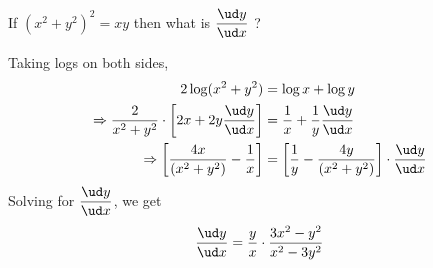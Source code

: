     \question[7] If $(x^2+y^2)^2=xy$ then what is $\dfrac{\ud y}{\ud x}$ ?
    \ifprintanswers
    \fi 
    \begin{solution}[\fullpage]
    Taking logs on both sides,
      \begin{align}
        2\log(x^2+y^2) &= \log x + \log y \\ 
        \Rightarrow \dfrac{2}{x^2+y^2}\cdot\left[ 2x+2y\dfrac{\ud y}{\ud x}\right] &=
        \dfrac{1}{x} + \dfrac{1}{y}\dfrac{\ud y}{\ud x} \\ 
        \Rightarrow\left[\frac{4x}{(x^2+y^2)}-\frac{1}{x}\right] &=
        \left[\frac{1}{y} - \frac{4y}{(x^2+y^2)}\right]\cdot\frac{\ud y}{\ud x} 
      \end{align}  
      Solving for $\dfrac{\ud y}{\ud x}$, we get \\
      \begin{align}
         \dfrac{\ud y}{\ud x} = \frac{y}{x} \cdot \dfrac{3x^2-y^2}{x^2-3y^2}  
      \end{align} 
      
    \end{solution} 
